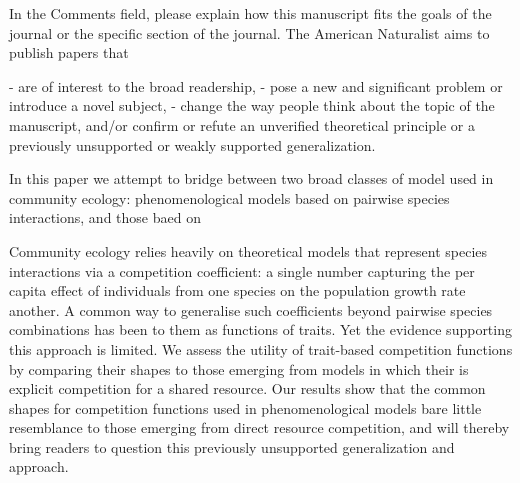 
In the Comments field, please explain how this manuscript fits the goals of the journal or the specific section of the journal. The American Naturalist aims to publish papers that

- are of interest to the broad readership,
- pose a new and significant problem or introduce a novel subject,
- change the way people think about the topic of the manuscript, and/or
    confirm or refute an unverified theoretical principle or a previously unsupported or weakly supported generalization.


In this paper we attempt to bridge between two broad classes of model used in community ecology: phenomenological models based on pairwise species interactions, and those baed on 


Community ecology relies heavily on theoretical models that represent species interactions via a competition coefficient: a single number capturing the per capita effect of individuals from one species on the population growth rate another. A common way to generalise such coefficients beyond pairwise species combinations has been to them as functions of traits. Yet the evidence supporting this approach is limited. We assess the utility of trait-based competition functions by comparing their shapes to those emerging from models in which their is explicit competition for a shared resource. Our results show that the common shapes for competition functions used in phenomenological models bare little resemblance to those emerging from direct resource competition, and will thereby bring readers to question this previously unsupported generalization and approach.

